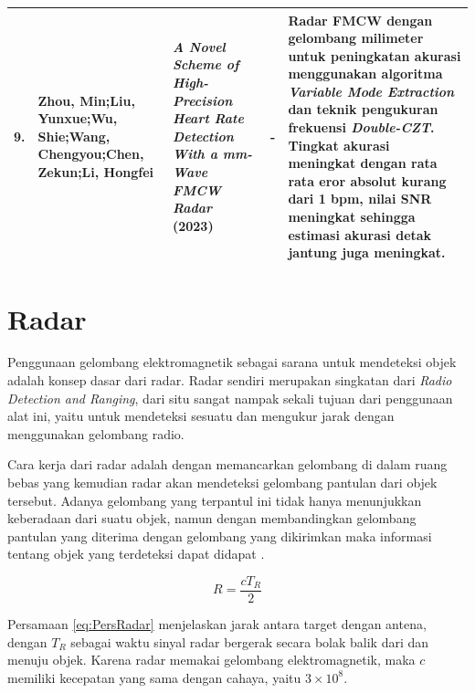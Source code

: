 \begin{center}
\begin{longtable}{|p{0.5cm}|p{2cm}|p{3cm}|p{2cm}|p{4cm}|}
	9. & Zhou, Min;\newline Liu, Yunxue;\newline Wu, Shie;\newline Wang, Chengyou;\newline Chen, Zekun;\newline Li, Hongfei
	& \textit{A Novel Scheme of High-Precision Heart Rate Detection With a mm-Wave FMCW Radar} (2023)
	& -
	& Radar FMCW dengan gelombang milimeter untuk peningkatan akurasi menggunakan algoritma \textit{Variable Mode Extraction} dan teknik pengukuran frekuensi \textit{Double-CZT}. Tingkat akurasi meningkat dengan rata rata eror absolut kurang dari 1 bpm, nilai SNR meningkat sehingga estimasi akurasi detak jantung juga meningkat.
	\\ \hline
	\end{longtable}
\end{center}

\section{Radar}

Penggunaan gelombang elektromagnetik sebagai sarana untuk mendeteksi objek adalah konsep dasar dari radar. Radar sendiri merupakan singkatan dari \textit{Radio Detection and Ranging}, dari situ sangat nampak sekali tujuan dari penggunaan alat ini, yaitu untuk mendeteksi sesuatu dan mengukur jarak dengan menggunakan gelombang radio. 

Cara kerja dari radar adalah dengan memancarkan gelombang di dalam ruang bebas yang kemudian radar akan mendeteksi gelombang pantulan dari objek tersebut. Adanya gelombang yang terpantul ini tidak hanya menunjukkan keberadaan dari suatu objek, namun dengan membandingkan gelombang pantulan yang diterima dengan gelombang yang dikirimkan maka informasi tentang objek yang terdeteksi dapat didapat \cite{Skolnik2001}.

\begin{equation}
	R = \frac{cT_{R}}{2}
	\label{eq:PersRadar}
\end{equation}

Persamaan \ref{eq:PersRadar} menjelaskan jarak antara target dengan antena, dengan $T_{R}$ sebagai waktu sinyal radar bergerak secara bolak balik dari dan menuju objek. Karena radar memakai gelombang elektromagnetik, maka $c$ memiliki kecepatan yang sama dengan cahaya, yaitu $3 \times 10 ^{8}$.

